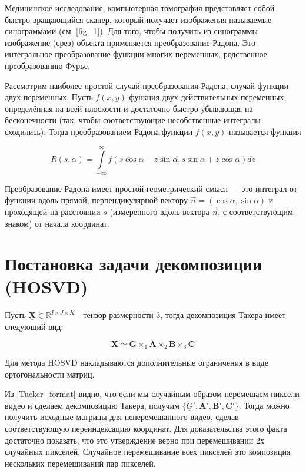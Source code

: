 \documentclass[14pt]{extarticle}
\begin{document}
Медицинское исследование, компьютерная томография представляет собой быстро вращающийся сканер, который получает изображения называемые синограммами (см. \ref{fig_1}). Для того, чтобы получить из синограммы изображение (срез) объекта применяется преобразование Радона. Это интегральное преобразование функции многих переменных, родственное преобразованию Фурье. 

Рассмотрим наиболее простой случай преобразования Радона, случай функции двух переменных.
Пусть $f(x,y)$ функция двух действительных переменных, определённая на всей плоскости и достаточно быстро убывающая на бесконечности (так, чтобы соответствующие несобственные интегралы сходились). Тогда преобразованием Радона функции $f(x,y)$ называется функция

$$ R(s,\alpha ) = \int \limits _{-\infty }^{\infty }f(s\cos \alpha -z\sin \alpha ,s\sin \alpha +z\cos \alpha )dz$$ 

Преобразование Радона имеет простой геометрический смысл — это интеграл от функции вдоль прямой, перпендикулярной вектору $\vec{n}=(\cos \alpha ,\sin \alpha )$ и проходящей на расстоянии $s$ (измеренного вдоль вектора $\vec{n}$, с соответствующим знаком) от начала координат.

\section{Постановка задачи декомпозиции (HOSVD)}

Пусть $\mathbf{\underline{X}} \in \mathbb{R}^{I \times J \times K}$ - тензор размерности 3, тогда декомпозиция Такера имеет следующий вид:

\begin{equation}
    \label{Tucker_format}
    \mathbf{\underline{X}} \simeq \mathbf{\underline{G}} \times_1 \mathbf{A} \times_2 \mathbf{B} \times_3 \mathbf{C}
\end{equation}

Для метода HOSVD накладываются дополнительные ограничения в виде ортогональности матриц.

Из \eqref{Tucker_format} видно, что если мы случайным образом перемешаем пиксели видео и сделаем декомпозицию Такера, получим $\{\underline{G}', \mathbf{A}', \mathbf{B}', \mathbf{C}'\}$. Тогда можно получить исходные матрицы для неперемешанного видео, сделав соответствующую переиндексацию координат. Для доказательства этого факта достаточно показать, что это утверждение верно при перемешивании 2х случайных пикселей. Случайное перемешивание всех пикселей это композиция нескольких перемешиваний пар пикселей.
\end{document}
